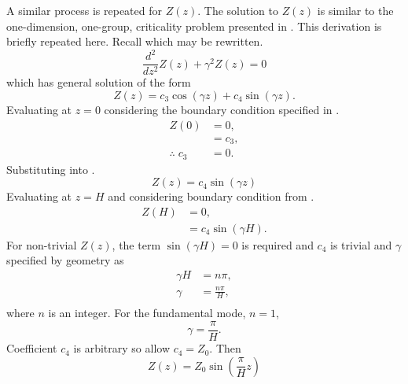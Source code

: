   A similar process is repeated for $Z(z)$. The solution to $Z(z)$ is similar to
  the one-dimension, one-group, criticality problem presented in
  . This derivation is briefly repeated here. Recall
   which may be rewritten.
  \begin{equation}
    \frac{d^2}{dz^2} Z(z) + \gamma^2 Z(z) = 0
  \end{equation}
  which has general solution of the form
  \begin{equation}
    \label{eq:finite_cyl_z_general}
    Z(z) = c_3 \cos(\gamma z) + c_4 \sin(\gamma z).
  \end{equation}
  Evaluating  at $z=0$ considering the boundary
  condition specified in .
  \begin{align}
    Z(0) &= 0, \\
    &= c_3, \\
    \label{eq:finite_cyl_c3}
    \therefore \; c_3 &= 0.
  \end{align}
  Substituting  into .
  \begin{equation}
    \label{eq:finite_cyl_z_sin}
    Z(z) = c_4 \sin(\gamma z)
  \end{equation}
  Evaluating  at $z=H$ and considering boundary
  condition from .
  \begin{align}
    Z(H) &= 0, \\
    &= c_4 \sin(\gamma H).
  \end{align}
  For non-trivial $Z(z)$, the term $\sin(\gamma H)=0$ is required and $c_4$ is
  trivial and $\gamma$ specified by geometry as
  \begin{align}
    \gamma H &= n \pi, \\
    \gamma &= \frac{n \pi}{H}, \\
  \end{align}
  where $n$ is an integer. For the fundamental mode, $n=1$,
  \begin{equation}
    \label{eq:finite_cyl_gamma}
    \gamma = \frac{\pi}{H}.
  \end{equation}
  Coefficient $c_4$ is arbitrary so allow $c_4 = Z_0$. Then
  \begin{equation}
    \label{eq:finite_cyl_Z}
    Z(z) = Z_0 \sin\left(\frac{\pi}{H} z\right)
  \end{equation}


